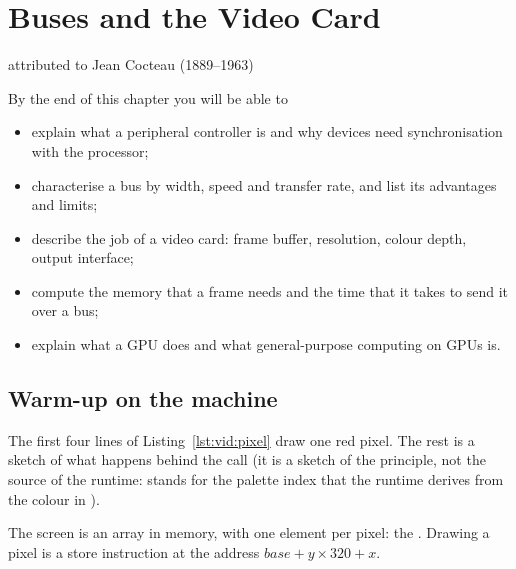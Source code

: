 \chapter{Buses and the Video Card}
\label{ch:video}

  {attributed to Jean Cocteau (1889--1963)}

\begin{chapgoals}
By the end of this chapter you will be able to
\begin{itemize}
\item explain what a peripheral controller is and why devices need synchronisation with the processor;
\item characterise a bus by width, speed and transfer rate, and list its advantages and limits;
\item describe the job of a video card: frame buffer, resolution, colour depth, output interface;
\item compute the memory that a frame needs and the time that it takes to send it over a bus;
\item explain what a GPU does and what general-purpose computing on GPUs is.
\end{itemize}
\end{chapgoals}


\section{Warm-up on the machine}


The first four lines of Listing~\ref{lst:vid:pixel} draw one red pixel. The
rest is a sketch of what happens behind the call (it is a sketch of the
principle, not the source of the runtime:  stands for the palette
index that the runtime derives from the colour in ).

\begin{prgconcept}
The screen is an array in memory, with one element per pixel: the
. Drawing a pixel is a store instruction at the address
$\mathit{base}+y\times 320+x$.
\end{prgconcept}

